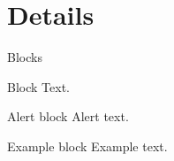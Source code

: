 \documentclass{beamer}
\begin{document}
    \section{Details}
    \begin{frame}{Blocks}
        \begin{block}{Block}
            Text.
        \end{block}
        \pause
        \begin{alertblock}{Alert block}
            Alert \alert{text}.
        \end{alertblock}
        \pause
        \begin{exampleblock}{Example block}
            Example \textcolor{BSElightgreen}{text}.
        \end{exampleblock}
    \end{frame}
    
\end{document}
